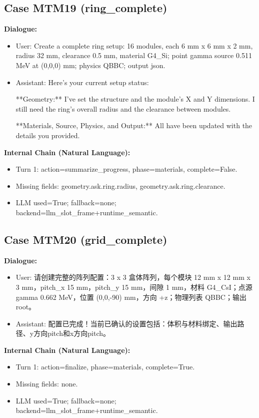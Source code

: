 \documentclass[11pt]{ctexart}
\begin{document}
\subsection{Case MTM19 (ring\_complete)}
\textbf{Dialogue:}
\begin{itemize}
\item User: Create a complete ring setup: 16 modules, each 6 mm x 6 mm x 2 mm, radius 32 mm, clearance 0.5 mm, material G4\_Si; point gamma source 0.511 MeV at (0,0,0) mm; physics QBBC; output json.
\item Assistant: Here's your current setup status:

**Geometry:** I've set the structure and the module's X and Y dimensions. I still need the ring's overall radius and the clearance between modules.

**Materials, Source, Physics, and Output:** All have been updated with the details you provided.
\end{itemize}
\textbf{Internal Chain (Natural Language):}
\begin{itemize}
\item Turn 1: action=summarize\_progress, phase=materials, complete=False.
\item Missing fields: geometry.ask.ring.radius, geometry.ask.ring.clearance.
\item LLM used=True; fallback=none; backend=llm\_slot\_frame+runtime\_semantic.
\end{itemize}
\subsection{Case MTM20 (grid\_complete)}
\textbf{Dialogue:}
\begin{itemize}
\item User: 请创建完整的阵列配置：3 x 3 盒体阵列，每个模块 12 mm x 12 mm x 3 mm，pitch\_x 15 mm，pitch\_y 15 mm，间隙 1 mm，材料 G4\_CsI；点源 gamma 0.662 MeV，位置 (0,0,-90) mm，方向 +z；物理列表 QBBC；输出 root。
\item Assistant: 配置已完成！当前已确认的设置包括：体积与材料绑定、输出路径、y方向pitch和x方向pitch。
\end{itemize}
\textbf{Internal Chain (Natural Language):}
\begin{itemize}
\item Turn 1: action=finalize, phase=materials, complete=True.
\item Missing fields: none.
\item LLM used=True; fallback=none; backend=llm\_slot\_frame+runtime\_semantic.
\end{itemize}
\end{document}
